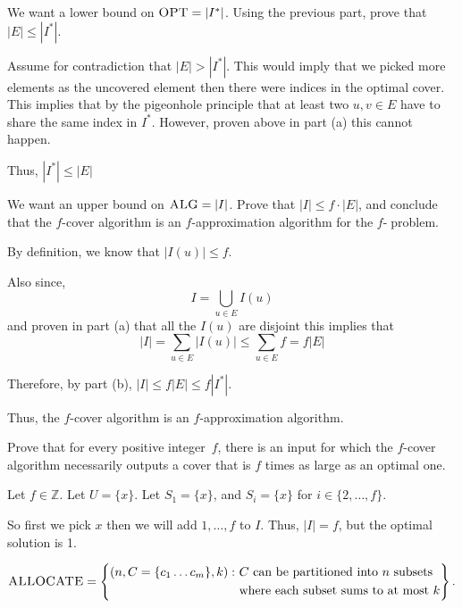 \documentclass[12pt, letterpaper]{article}
\newcommand{\Z}{\mathbb{Z}}
\begin{document}
\newcommand{\OPT}{\textsc{OPT}}
\newcommand{\ALG}{\textsc{ALG}}
\begin{subproblem}{}
    We want a lower bound on $\OPT = |I^*|$.
    Using the previous part, prove that $|E| \leq |I^*|$.
\end{subproblem}
\begin{problemproof}
    Assume for contradiction that $|E| > |I^*|$. This would imply that we picked more elements as the uncovered element then there were indices in the optimal cover. This implies that by the pigeonhole principle that at least two $u,v \in E$ have to share the same index in $I^*$. However, proven above in part (a) this cannot happen.

    Thus, $|I^*| \leq |E|$
\end{problemproof}

\begin{subproblem}{}
    We want an upper bound on $\ALG = |I|$.
    Prove that $|I| \leq f \cdot |E|$, and conclude that the $f$-cover algorithm is an $f$-approximation algorithm for the $f$-\SC $\;$problem.
\end{subproblem}
\begin{problemproof}
    By definition, we know that $|I(u)| \leq f$.

    Also since,
    \[I=\bigcup_{u \in E}I(u)\]
    and proven in part (a) that all the $I(u)$ are disjoint this implies that 
    \[|I|=\sum_{u \in E}|I(u)| \leq \sum_{u \in E}f = f|E|\]

    Therefore, by part (b), $|I| \leq f|E| \leq f |I^*|$.

    Thus, the $f$-cover algorithm is an $f$-approximation algorithm.
\end{problemproof}

\begin{subproblem}{}
    Prove that for every positive integer~$f$, there is an input for which the $f$-cover algorithm necessarily outputs a cover that is $f$ times as large as an optimal one.
\end{subproblem}
\begin{problemproof}
    Let $f \in \Z$. Let $U=\{x\}$. Let $S_1=\{x\}$, and $S_i=\{x\}$ for $i \in \{2,\dots,f\}$.

    So first we pick $x$ then we will add $1,\dots,f$ to $I$. Thus, $|I|=f$, but the optimal solution is 1.
\end{problemproof}

\begin{problem}{}
    \newcommand{\Allocate}{\textsc{ALLOCATE}}
    \vspace{-15pt}
\[
    \Allocate = \left\{
    \begin{aligned}
    (n, C=\{c_1\ldots c_m\}, k) :~ &\text{$C$ can be partitioned into $n$ subsets}\\
    &\text{where each subset sums to at most $k$}
    \end{aligned}
    \right\}.
\]
\end{problem}
\end{document}

